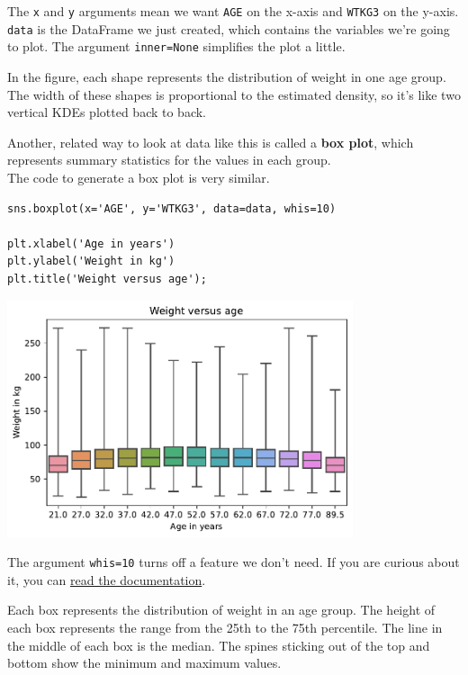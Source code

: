 The \passthrough{\lstinline!x!} and \passthrough{\lstinline!y!}
arguments mean we want \passthrough{\lstinline!AGE!} on the x-axis and
\passthrough{\lstinline!WTKG3!} on the y-axis.
\passthrough{\lstinline!data!} is the DataFrame we just created, which
contains the variables we're going to plot. The argument
\passthrough{\lstinline!inner=None!} simplifies the plot a little.

In the figure, each shape represents the distribution of weight in one
age group. The width of these shapes is proportional to the estimated
density, so it's like two vertical KDEs plotted back to back.

Another, related way to look at data like this is called a \textbf{box
plot}, which represents summary statistics for the values in each
group.\\
The code to generate a box plot is very similar.

\begin{lstlisting}[]
sns.boxplot(x='AGE', y='WTKG3', data=data, whis=10)

plt.xlabel('Age in years')
plt.ylabel('Weight in kg')
plt.title('Weight versus age');
\end{lstlisting}

\begin{center}
\includegraphics[width=4in]{chapters/09_relationships_files/09_relationships_44_0.pdf}
\end{center}

The argument \passthrough{\lstinline!whis=10!} turns off a feature we
don't need. If you are curious about it, you can
\href{https://seaborn.pydata.org/generated/seaborn.boxplot.html}{read
the documentation}.

Each box represents the distribution of weight in an age group. The
height of each box represents the range from the 25th to the 75th
percentile. The line in the middle of each box is the median. The spines
sticking out of the top and bottom show the minimum and maximum values.


